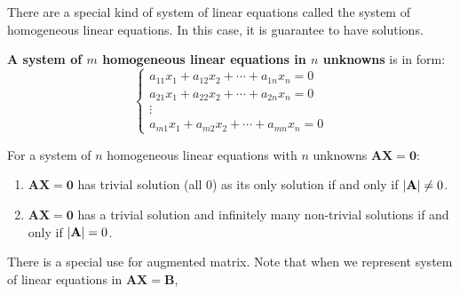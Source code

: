 \documentclass{huhtakm-template-book}
\begin{document}
There are a special kind of system of linear equations called the system of homogeneous linear equations. In this case, it is guarantee to have solutions.
\begin{defn}
    \textbf{A system of $m$ homogeneous linear equations in $n$ unknowns} is in form:
    \begin{equation*}
        \begin{cases}
            a_{11}x_{1}+a_{12}x_{2}+\cdots+a_{1n}x_{n}=0\\
            a_{21}x_{1}+a_{22}x_{2}+\cdots+a_{2n}x_{n}=0\\
            \vdots\\
            a_{m1}x_{1}+a_{m2}x_{2}+\cdots+a_{mn}x_{n}=0
        \end{cases}
    \end{equation*}
\end{defn}
\newpage
\begin{thm}
    For a system of $n$ homogeneous linear equations with $n$ unknowns $\mathbf{AX}=\mathbf{0}$:
    \begin{enumerate}
        \item $\mathbf{AX}=\mathbf{0}$ has trivial solution (all 0) as its only solution if and only if $\left|{\mathbf{A}}\right|\neq 0$.
        \item $\mathbf{AX}=\mathbf{0}$ has a trivial solution and infinitely many non-trivial solutions if and only if $\left|{\mathbf{A}}\right|=0$.
    \end{enumerate}
\end{thm}
There is a special use for augmented matrix. Note that when we represent system of linear equations in $\mathbf{AX}=\mathbf{B}$,
\end{document}
